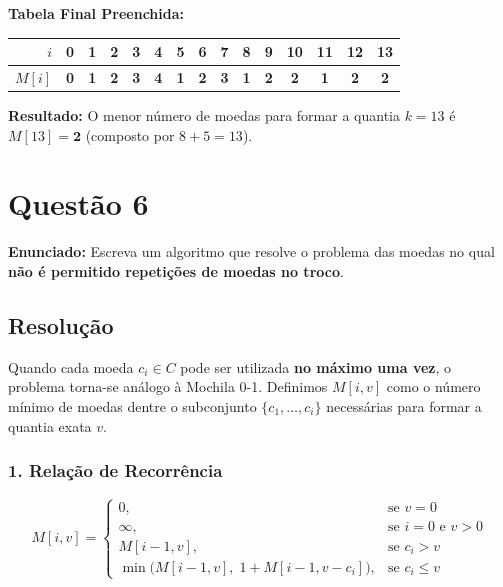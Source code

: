 \documentclass[11pt,a4paper]{article}
\begin{document}
\textbf{Tabela Final Preenchida:}
\begin{center}
\begin{tabular}{r|cccccccccccccc}
\toprule
$i$ & 0 & 1 & 2 & 3 & 4 & 5 & 6 & 7 & 8 & 9 & 10 & 11 & 12 & 13 \\
\midrule
$M[i]$ & \textbf{0} & \textbf{1} & \textbf{2} & \textbf{3} & \textbf{4} & \textbf{1} & \textbf{2} & \textbf{3} & \textbf{1} & \textbf{2} & \textbf{2} & \textbf{1} & \textbf{2} & \textbf{2} \\
\bottomrule
\end{tabular}
\end{center}

\textbf{Resultado:} O menor número de moedas para formar a quantia $k = 13$ é $M[13] = \mathbf{2}$ (composto por $8 + 5 = 13$).

\vspace{0.4cm}

\section*{Questão 6}
\textbf{Enunciado:} Escreva um algoritmo que resolve o problema das moedas no qual \textbf{não é permitido repetições de moedas no troco}.

\subsection*{Resolução}

Quando cada moeda $c_i \in C$ pode ser utilizada \textbf{no máximo uma vez}, o problema torna-se análogo à Mochila 0-1. Definimos $M[i, v]$ como o número mínimo de moedas dentre o subconjunto $\{c_1, \dots, c_i\}$ necessárias para formar a quantia exata $v$.

\subsubsection*{1. Relação de Recorrência}
\begin{equation}
M[i, v] = 
\begin{cases}
0, & \text{se } v = 0 \\
\infty, & \text{se } i = 0 \text{ e } v > 0 \\
M[i-1, v], & \text{se } c_i > v \\
\min\Big(M[i-1, v], \; 1 + M[i-1, v - c_i]\Big), & \text{se } c_i \le v
\end{cases}
\end{equation}
\end{document}
